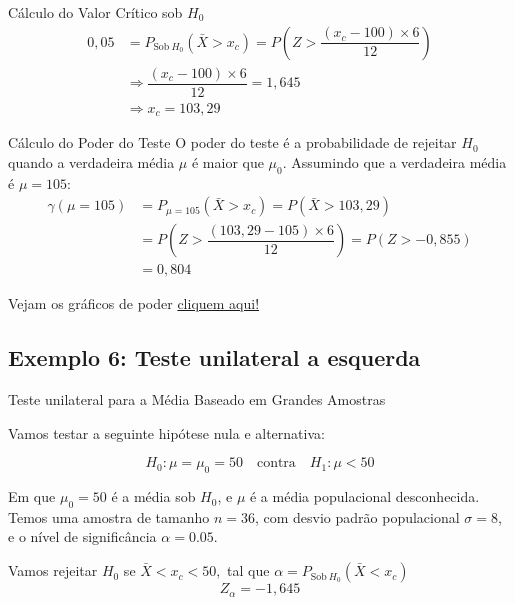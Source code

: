 \documentclass[12pt]{beamer}
\begin{document}
\begin{frame}{}
	\begin{block}{Cálculo do Valor Crítico sob $H_{0}$}
		\justifying
		\begin{align*}
			0,05&=P_{\text{Sob}~H_{0}}(\bar{X}>x_{c})=P(Z>\dfrac{(x_{c}-100)\times6}{12})\\
			&\Rightarrow \dfrac{(x_{c}-100)\times6}{12}=1,645\\
			&\Rightarrow x_{c}=103,29
		\end{align*}
	\end{block}
	\pause
	\begin{block}{Cálculo do Poder do Teste}
		\justifying
		O poder do teste é a probabilidade de rejeitar $H_0$ quando a verdadeira média $\mu$ é maior que $\mu_0$. Assumindo que a verdadeira média é $\mu = 105:$
		\begin{align*}
			\gamma(\mu=105)&=P_{\mu=105}(\bar{X}>x_{c})=P(\bar{X}>103,29)\\
			&=P(Z>\dfrac{(103,29-105)\times6}{12})=P(Z>-0,855)\\
			&=0,804
		\end{align*}
	\end{block}
\end{frame}

\begin{frame}{}
	\begin{block}{}
		Vejam os gráficos de poder \href{https://est711.shinyapps.io/FuncaoPoder/}{cliquem aqui!}
	\end{block}
\end{frame}

\subsection{Exemplo 6: Teste unilateral a esquerda}
\begin{frame}{Teste unilateral para a Média Baseado em Grandes Amostras}
	\begin{block}{}
		\justifying
		Vamos testar a seguinte hipótese nula e alternativa:
		
		\[
		H_0: \mu = \mu_0 = 50 \quad \text{contra} \quad H_1: \mu < 50
		\]
		
		Em que \( \mu_0 = 50 \) é a média sob \( H_0 \), e \( \mu \) é a média populacional desconhecida. Temos uma amostra de tamanho \( n = 36 \), com desvio padrão populacional \( \sigma = 8 \), e o nível de significância \( \alpha = 0.05 \).
		
		
	\end{block}
	\pause
	\begin{block}{}
		\justifying
		Vamos rejeitar $H_0$ se $\bar{X}<x_{c}<50,$ tal que $\alpha=P_{\text{Sob}~H_{0}}(\bar{X}<x_{c})$
		\[
		Z_{\alpha} = -1,645
		\]	
	\end{block}
\end{frame}
\end{document}
